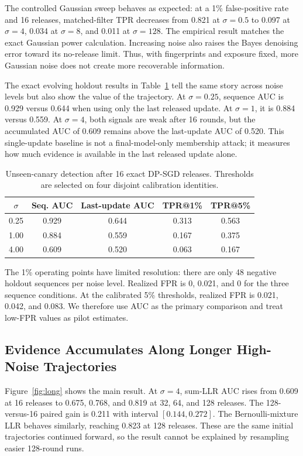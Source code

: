\documentclass[conference]{IEEEtran}
\begin{document}
The controlled Gaussian sweep behaves as expected: at a 1\% false-positive rate and 16 releases, matched-filter TPR decreases from 0.821 at $\sigma=0.5$ to 0.097 at $\sigma=4$, 0.034 at $\sigma=8$, and 0.011 at $\sigma=128$. The empirical result matches the exact Gaussian power calculation. Increasing noise also raises the Bayes denoising error toward its no-release limit. Thus, with fingerprints and exposure fixed, more Gaussian noise does not create more recoverable information.

The exact evolving holdout results in Table~\ref{tab:holdout} tell the same story across noise levels but also show the value of the trajectory. At $\sigma=0.25$, sequence AUC is 0.929 versus 0.644 when using only the last released update. At $\sigma=1$, it is 0.884 versus 0.559. At $\sigma=4$, both signals are weak after 16 rounds, but the accumulated AUC of 0.609 remains above the last-update AUC of 0.520. This single-update baseline is not a final-model-only membership attack; it measures how much evidence is available in the last released update alone.

\begin{table}[t]
\caption{Unseen-canary detection after 16 exact DP-SGD releases. Thresholds are selected on four disjoint calibration identities.}
\label{tab:holdout}
\centering
\begin{tabular}{ccccc}
\toprule
$\sigma$ & Seq. AUC & Last-update AUC & TPR@1\% & TPR@5\% \\
\midrule
0.25 & 0.929 & 0.644 & 0.313 & 0.563 \\
1.00 & 0.884 & 0.559 & 0.167 & 0.375 \\
4.00 & 0.609 & 0.520 & 0.063 & 0.167 \\
\bottomrule
\end{tabular}
\end{table}

The 1\% operating points have limited resolution: there are only 48 negative holdout sequences per noise level. Realized FPR is 0, 0.021, and 0 for the three sequence conditions. At the calibrated 5\% thresholds, realized FPR is 0.021, 0.042, and 0.083. We therefore use AUC as the primary comparison and treat low-FPR values as pilot estimates.

\subsection{Evidence Accumulates Along Longer High-Noise Trajectories}

Figure~\ref{fig:long} shows the main result. At $\sigma=4$, sum-LLR AUC rises from 0.609 at 16 releases to 0.675, 0.768, and 0.819 at 32, 64, and 128 releases. The 128-versus-16 paired gain is 0.211 with interval $[0.144,0.272]$. The Bernoulli-mixture LLR behaves similarly, reaching 0.823 at 128 releases. These are the same initial trajectories continued forward, so the result cannot be explained by resampling easier 128-round runs.
\end{document}

